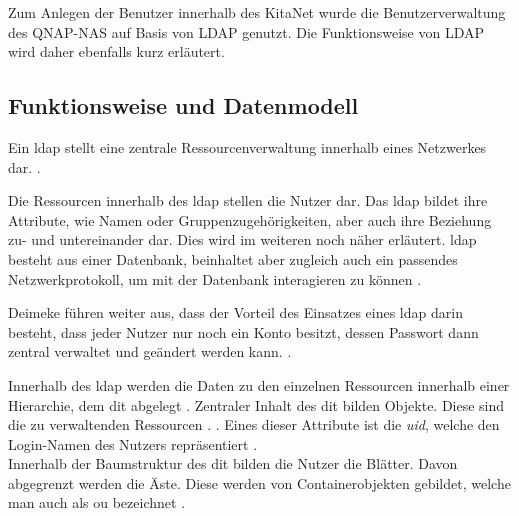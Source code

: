 Zum Anlegen der Benutzer innerhalb des KitaNet wurde die Benutzerverwaltung des QNAP-NAS auf Basis von LDAP genutzt. Die Funktionsweise von LDAP wird daher ebenfalls kurz erläutert.

\subsection{Funktionsweise und Datenmodell}

Ein \ac{ldap} stellt eine zentrale Ressourcenverwaltung innerhalb eines Netzwerkes dar.
 \citep[][611]{Deimeke2019}. 

Die Ressourcen innerhalb des \ac{ldap} stellen die Nutzer dar. Das \ac{ldap} bildet ihre Attribute, wie Namen oder Gruppenzugehörigkeiten, aber auch ihre Beziehung zu- und untereinander dar. Dies wird im weiteren noch näher erläutert. 
\ac{ldap} besteht aus einer Datenbank, beinhaltet aber zugleich auch ein passendes Netzwerkprotokoll, um mit der Datenbank interagieren zu können \citep[vgl.][3]{Gietz}.

Deimeke \ua führen weiter aus, dass der Vorteil des Einsatzes eines \ac{ldap} darin besteht, dass jeder Nutzer nur noch ein Konto besitzt, dessen Passwort dann zentral verwaltet und geändert werden kann.  \citep[][611]{Deimeke2019}.

Innerhalb des \ac{ldap} werden die Daten zu den einzelnen Ressourcen innerhalb einer Hierarchie, dem \ac{dit} abgelegt \citep[vgl.][7]{rfc4512}. Zentraler Inhalt des \ac{dit} bilden Objekte. Diese sind die zu verwaltenden Ressourcen \citep[vgl.][614]{Deimeke2019}.  \citep[][614]{Deimeke2019}. Eines dieser Attribute ist \zb die \textit{uid}, welche den Login-Namen des Nutzers repräsentiert \citep[][18]{rfc4519}. \\ Innerhalb der Baumstruktur des \ac{dit} bilden die Nutzer die Blätter. Davon abgegrenzt werden die Äste. Diese werden von Containerobjekten gebildet, welche man auch als \ac{ou} bezeichnet \citep[vgl.][614]{Deimeke2019}.

